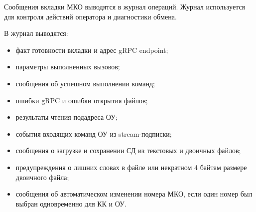 Сообщения вкладки МКО выводятся в журнал операций. Журнал используется для контроля действий оператора и диагностики обмена.

В журнал выводятся:

\begin{itemize}
	\item факт готовности вкладки и адрес gRPC endpoint;
	\item параметры выполненных вызовов;
	\item сообщения об успешном выполнении команд;
	\item ошибки gRPC и ошибки открытия файлов;
	\item результаты чтения подадреса ОУ;
	\item события входящих команд ОУ из stream-подписки;
	\item сообщения о загрузке и сохранении СД из текстовых и двоичных файлов;
	\item предупреждения о лишних словах в файле или некратном 4 байтам размере двоичного файла;
	\item сообщения об автоматическом изменении номера МКО, если один номер был выбран одновременно для КК и ОУ.
\end{itemize}

